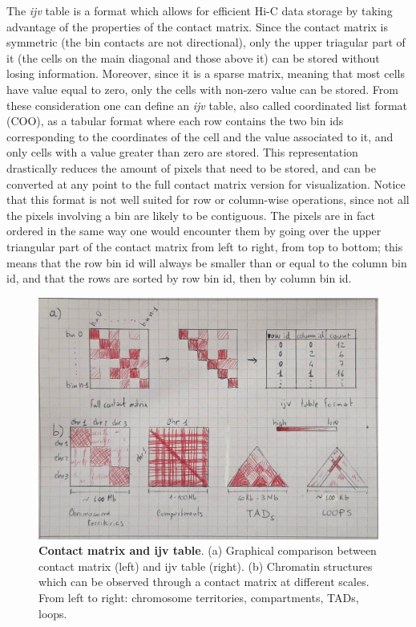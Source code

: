 The \emph{ijv} table is a format which allows for efficient Hi-C data storage by taking advantage of the properties of the contact matrix. Since the contact matrix is symmetric (the bin contacts are not directional), only the upper triagular part of it (the cells on the main diagonal and those above it) can be stored without losing information. Moreover, since it is a sparse matrix, meaning that most cells have value equal to zero, only the cells with non-zero value can be stored. From these consideration one can define an \emph{ijv} table, also called coordinated list format (COO), as a tabular format where each row contains the two bin ids corresponding to the coordinates of the cell and the value associated to it, and only cells with a value greater than zero are stored. This representation drastically reduces the amount of pixels that need to be stored, and can be converted at any point to the full contact matrix version for visualization. Notice that this format is not well suited for row or column-wise operations, since not all the pixels involving a bin are likely to be contiguous. The pixels are in fact ordered in the same way one would encounter them by going over the upper triangular part of the contact matrix from left to right, from top to bottom; this means that the row bin id will always be smaller than or equal to the column bin id, and that the rows are sorted by row bin id, then by column bin id.

\begin{figure}[ht]
  \centering
  \includegraphics[width=1\textwidth]{contact_matrix.jpeg}
  \caption{\textbf{Contact matrix and ijv table}. (a) Graphical comparison between contact matrix (left) and ijv table (right). (b) Chromatin structures which can be observed through a contact matrix at different scales. From left to right: chromosome territories, compartments, TADs, loops.}
  \label{fig:contacts}
\end{figure}


